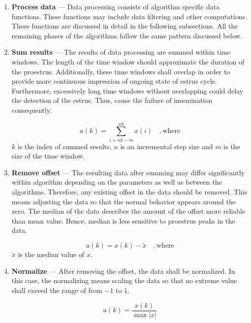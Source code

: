 \documentclass[english,12pt,a4paper,pdftex,elec,utf8]{aaltothesis}
\begin{document}
\begin{enumerate}

\item \textbf{Process data} --- Data processing consists of algorithm specific data functions. These functions may include data filtering and other computations. These functions are discussed in detail in the following subsections. All the remaining phases of the algorithms follow the same pattern discussed below. 

\item \textbf{Sum results} --- The results of data processing are summed within time windows. The length of the time window should approximate the duration of the proestrus. Additionally, these time windows shall overlap in order to provide more continuous impression of ongoing state of estrus cycle. Furthermore, excessively long time windows without overlapping could delay the detection of the estrus. Thus, cause the failure of insemination consequently. 

\begin{equation}
u(k) =\sum\limits^{nk}_{i = nk - m} x(i) \mathrm{\hspace{1em}, where}
\end{equation}
$k$ is the index of summed results, $n$ is an incremental step size and $m$ is the size of the time window.

\item \textbf{Remove offset} --- The resulting data after summing may differ significantly within algorithm depending on the parameters as well as between the algorithms. Therefore, any existing offset in the data should be removed. This means adjusting the data so that the normal behavior appears around the zero. The median of the data describes the amount of the offset more reliable than mean value. Hence, median is less sensitive to proestrus peaks in the data.  

\begin{equation}
u(k) = x(k) - \tilde{x} \mathrm{\hspace{1em}, where}
\end{equation}
$\tilde{x}$ is the median value of $x$.

\item \textbf{Normalize} --- After removing the offset, the data shall be normalized. In this case, the normalizing means scaling the data so that no extreme value shall exceed the range of from $-1$ to $1$.

\begin{equation}
u(k) = \frac{x(k)}{\max  \left| x \right|} 
\end{equation}



\end{enumerate}
\end{document}
